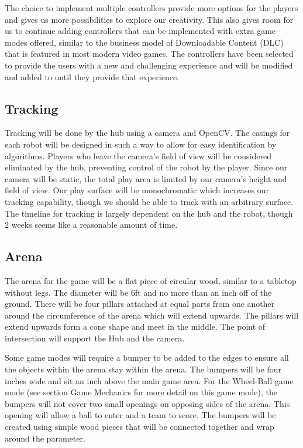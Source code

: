 \documentclass[11pt]{ieeeconf}
\begin{document}
The choice to implement multiple controllers provide more options for the players and gives us more possibilities to explore our creativity. This also gives room for us to continue adding controllers that can be implemented with extra game modes offered, similar to the business model of Downloadable Content (DLC) that is featured in most modern video games. The controllers have been selected to provide the users with a new and challenging experience and will be modified and added to until they provide that experience. 

\subsection{Tracking}

Tracking will be done by the hub using a camera and OpenCV. The casings for each robot will be designed in such a way to allow for easy identification by algorithms. Players who leave the camera's field of view will be considered eliminated by the hub, preventing control of the robot by the player. Since our camera will be static, the total play area is limited by our camera's height and field of view. Our play surface will be monochromatic which increases our tracking capability, though we should be able to track with an arbitrary surface. The timeline for tracking is largely dependent on the hub and the robot, though 2 weeks seems like a reasonable amount of time.

\subsection{Arena}

The arena for the game will be a flat piece of circular wood, similar to a tabletop without legs. The diameter will be 6ft and no more than an inch off of the ground. There will be four pillars attached at equal parts from one another around the circumference of the arena which will extend upwards. The pillars will extend upwards form a cone shape and meet in the middle. The point of intersection will support the Hub and the camera. 

Some game modes will require a bumper to be added to the edges to ensure all the objects within the arena stay within the arena. The bumpers will be four inches wide and sit an inch above the main game area. For the Wheel-Ball game mode (see section Game Mechanics for more detail on this game mode), the bumpers will not cover two small openings on opposing sides of the arena. This opening will allow a ball to enter and a team to score. The bumpers will be created using simple wood pieces that will be connected together and wrap around the parameter. 
\end{document}
